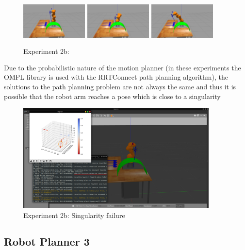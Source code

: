 \begin{center}
\begin{figure}[H]
\includegraphics[width=0.3\textwidth]{images/robot_planner2b/robot_planner2b_7}
\includegraphics[width=0.3\textwidth]{images/robot_planner2b/robot_planner2b_8}
\includegraphics[width=0.3\textwidth]{images/robot_planner2b/robot_planner2b_9}\\
\caption{Experiment 2b:}
\end{figure}
\end{center}

Due to the probabilistic nature of the motion planner (in these experiments the OMPL library is used with the RRTConnect path planning algorithm), the solutions 
to the path planning problem are not always the same and thus it is possible that the robot arm reaches a pose which is close to a singularity
\begin{center}
\begin{figure}[H]
\centering
\includegraphics[width=0.9\textwidth]{images/robot_planner2b/singularity_failure.png}
\caption{Experiment 2b: Singularity failure}
\end{figure}
\end{center}

\subsection{Robot Planner 3}

